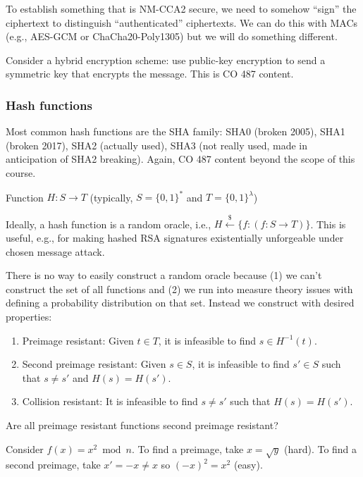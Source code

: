 \documentclass[notes]{agony}
\newcommand{\xgets}{\xleftarrow}
\newcommand{\ndgets}{\xgets{\mathdollar}}
\begin{document}
To establish something that is NM-CCA2 secure, we need to somehow ``sign''
the ciphertext to distinguish ``authenticated'' ciphertexts.
We can do this with MACs (e.g., AES-GCM or ChaCha20-Poly1305)
but we will do something different.

Consider a hybrid encryption scheme:
use public-key encryption to send a symmetric key that encrypts the message.
This is CO 487 content.

\subsubsection*{Hash functions}

Most common hash functions are the SHA family:
SHA0 (broken 2005), SHA1 (broken 2017), SHA2 (actually used),
SHA3 (not really used, made in anticipation of SHA2 breaking).
Again, CO 487 content beyond the scope of this course.

\begin{defn}
  Function $H : S \to T$ (typically, $S = \{0,1\}^*$ and $T = \{0,1\}^\lambda$)
\end{defn}

Ideally, a hash function is a random oracle, i.e.,
$H \ndgets \{ f : (f : S \to T) \}$.
This is useful, e.g., for making hashed RSA signatures
existentially unforgeable under chosen message attack.

There is no way to easily construct a random oracle
because (1) we can't construct the set of all functions and
(2) we run into measure theory issues with defining a probability distribution on that set.
Instead we construct with desired properties:
\begin{enumerate}[1.]
  \item Preimage resistant: Given $t \in T$, it is infeasible to find $s \in H^{-1}(t)$.
  \item Second preimage resistant: Given $s \in S$, it is infeasible to find
        $s' \in S$ such that $s \neq s'$ and $H(s) = H(s')$.
  \item Collision resistant: It is infeasible to find $s \neq s'$
        such that $H(s) = H(s')$.
\end{enumerate}

\begin{example}
  Are all preimage resistant functions second preimage resistant?
\end{example}
\begin{sol}
  Consider $f(x) = x^2 \bmod n$.
  To find a preimage, take $x = \sqrt{y}$ (hard).
  To find a second preimage, take $x' = -x \neq x$ so $(-x)^2 = x^2$ (easy).
\end{sol}
\end{document}
